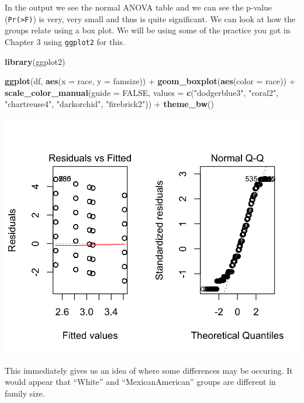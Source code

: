 \documentclass[]{tufte-book}
\newenvironment{Shaded}{}{}
\newcommand{\KeywordTok}[1]{\textcolor[rgb]{0.00,0.44,0.13}{\textbf{#1}}}
\newcommand{\DataTypeTok}[1]{\textcolor[rgb]{0.56,0.13,0.00}{#1}}
\newcommand{\StringTok}[1]{\textcolor[rgb]{0.25,0.44,0.63}{#1}}
\newcommand{\OtherTok}[1]{\textcolor[rgb]{0.00,0.44,0.13}{#1}}
\newcommand{\OperatorTok}[1]{\textcolor[rgb]{0.40,0.40,0.40}{#1}}
\newcommand{\NormalTok}[1]{#1}
\theoremstyle{definition}
\theoremstyle{definition}
\theoremstyle{remark}
\begin{document}
In the output we see the normal ANOVA table and we can see the p-value
(\texttt{Pr(\textgreater{}F)}) is very, very small and thus is quite
significant. We can look at how the groups relate using a box plot. We
will be using some of the practice you got in Chapter 3 using
\texttt{ggplot2} for this.

\begin{Shaded}
\begin{Highlighting}[]
\KeywordTok{library}\NormalTok{(ggplot2)}

\KeywordTok{ggplot}\NormalTok{(df, }\KeywordTok{aes}\NormalTok{(}\DataTypeTok{x =}\NormalTok{ race, }\DataTypeTok{y =}\NormalTok{ famsize)) }\OperatorTok{+}\StringTok{ }\KeywordTok{geom_boxplot}\NormalTok{(}\KeywordTok{aes}\NormalTok{(}\DataTypeTok{color =}\NormalTok{ race)) }\OperatorTok{+}\StringTok{ }
\StringTok{    }\KeywordTok{scale_color_manual}\NormalTok{(}\DataTypeTok{guide =} \OtherTok{FALSE}\NormalTok{, }\DataTypeTok{values =} \KeywordTok{c}\NormalTok{(}\StringTok{"dodgerblue3"}\NormalTok{, }
        \StringTok{"coral2"}\NormalTok{, }\StringTok{"chartreuse4"}\NormalTok{, }\StringTok{"darkorchid"}\NormalTok{, }
        \StringTok{"firebrick2"}\NormalTok{)) }\OperatorTok{+}\StringTok{ }\KeywordTok{theme_bw}\NormalTok{()}
\end{Highlighting}
\end{Shaded}

\includegraphics{_main_files/figure-latex/unnamed-chunk-63-1}

This immediately gives us an idea of where some differences may be
occuring. It would appear that ``White'' and ``MexicanAmerican'' groups
are different in family size.
\end{document}
